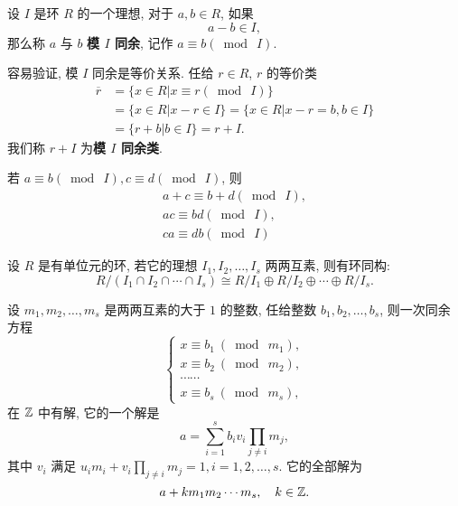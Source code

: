 \begin{definition}\label{环的同余}

	设 $I$ 是环 $R$ 的一个理想, 对于 $a,b\in R$, 如果 $$a-b\in I,$$ 那么称 $a$ 与 $b$ \textbf{模 $I$ 同余}, 记作 $a\equiv b(\bmod\ I)$.

	容易验证, 模 $I$ 同余是等价关系. 任给 $r\in R$, $r$ 的等价类 $$
	\begin{array}{rl}
		\overline{r} &=\{x\in R|x\equiv r(\bmod\ I)\} \\
			&=\{x\in R|x-r\in I\} = \{x\in R|x-r=b,b\in I\} \\
			&=\{r+b|b\in I\}=r+I.
	\end{array}
	$$
	我们称 $r+I$ 为\textbf{模 $I$ 同余类}.
\end{definition}

\begin{property}
	若 $a\equiv b(\bmod\ I),c\equiv d(\bmod\ I)$, 则 $$
	\begin{array}{c}
		a+c\equiv b+d(\bmod\ I),\\
		ac\equiv bd(\bmod\ I),\\
		ca\equiv db(\bmod\ I)
	\end{array}
	$$
\end{property}

\begin{theorem}
	设 $R$ 是有单位元的环, 若它的理想 $I_1,I_2,\ldots,I_s$ 两两互素, 则有环同构: \begin{equation}
		R/(I_1\cap I_2\cap\cdots\cap I_s)\cong R/I_1\oplus R/I_2\oplus\cdots\oplus R/I_s.
	\end{equation}
\end{theorem}

\begin{theorem}[中国剩余定理]\label{中国剩余定理}
	设 $m_1,m_2,\ldots,m_s$ 是两两互素的大于 $1$ 的整数, 任给整数 $b_1,b_2,\ldots,b_s$, 则一次同余方程
	\begin{equation}
		\left\{
		\begin{array}{c}
			x\equiv b_1\ (\bmod\ m_1), \\
			x\equiv b_2\ (\bmod\ m_2), \\
			\cdots\cdots \\
			x\equiv b_s\ (\bmod\ m_s),
		\end{array}
		\right.
	\end{equation}
	在 $\mathbb Z$ 中有解, 它的一个解是 $$a=\sum\limits_{i=1}^s b_iv_i\prod\limits_{j\neq i}m_j,$$
	其中 $v_i$ 满足 $u_im_i+v_i\prod\limits_{j\neq i}m_j=1,i=1,2,\ldots,s$. 它的全部解为 $$a+km_1m_2\cdots m_s,\quad k\in\mathbb Z.$$
\end{theorem}


